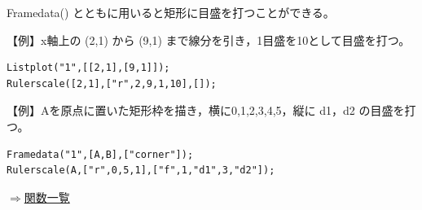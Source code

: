 \documentclass[papersize,a4paper,12pt,uplatex]{jsarticle}
\begin{document}
\begin{description}
Framedata() とともに用いると矩形に目盛を打つことができる。

\vspace{\baselineskip}
【例】x軸上の (2,1) から (9,1) まで線分を引き，1目盛を10として目盛を打つ。
\begin{verbatim}
Listplot("1",[[2,1],[9,1]]);
Rulerscale([2,1],["r",2,9,1,10],[]);
\end{verbatim}
\vspace{\baselineskip}
\begin{center} \scalebox{0.9}{} \end{center}
\vspace{\baselineskip}

【例】Aを原点に置いた矩形枠を描き，横に0,1,2,3,4,5，縦に d1，d2 の目盛を打つ。
\begin{verbatim}
Framedata("1",[A,B],["corner"]);
Rulerscale(A,["r",0,5,1],["f",1,"d1",3,"d2"]);
\end{verbatim}
\begin{center}\scalebox{0.9}{ } \end{center}
\begin{flushright}\hyperlink{functionlist}{$\Rightarrow$関数一覧}\end{flushright}

\end{description}

\end{document}
